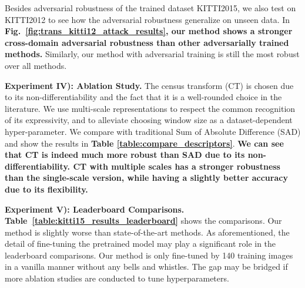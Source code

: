 \documentclass[10pt,twocolumn,letterpaper]{article}
\begin{document}
Besides adversarial robustness of the trained dataset KITTI2015, we also test on KITTI2012 to see how the adversarial robustness generalize on unseen data. In \textbf{Fig.~\ref{fig:trans_kitti12_attack_results}, our method shows a stronger cross-domain adversarial robustness than other adversarially trained methods.} Similarly, our method with adversarial training is still the most robust over all methods.



\textbf{Experiment IV): Ablation Study.} 
The census transform (CT) is chosen due to its non-differentiability and the fact that it is a well-rounded choice in the literature. We use multi-scale representations to respect the common recognition of its expressivity, and to alleviate choosing window size as a dataset-dependent hyper-parameter. We compare with traditional Sum of Absolute Difference (SAD) and show the results in \textbf{Table \ref{table:compare_descriptors}}. \textbf{We can see that CT is indeed much more robust than SAD due to its non-differentiability. CT with multiple scales has a stronger robustness than the single-scale version, while having a slightly better accuracy due to its flexibility. }

\begin{table} [ht]
\begin{center}
\end{center}
\caption{Comparison with CT with window size $11$ and multi-scale SAD}
\label{table:compare_descriptors}
\end{table}


\textbf{Experiment V): Leaderboard Comparisons.} \textbf{Table~\ref{table:kitti15_results_leaderboard}} shows the comparisons. Our method is slightly worse than state-of-the-art methods. As aforementioned, the detail of fine-tuning the pretrained model may play a significant role in the leaderboard comparisons. Our method is only fine-tuned by 140 training images in a vanilla manner without any bells and whistles. The gap may be bridged if more ablation studies are conducted to tune hyperparameters. 
\end{document}
